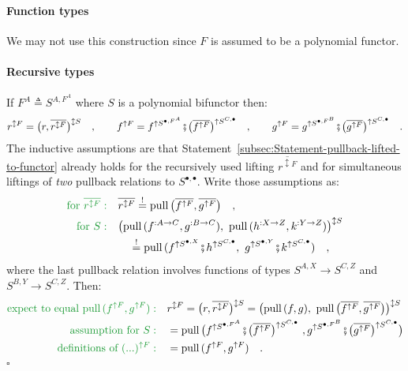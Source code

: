 \paragraph{Function types}

We may not use this construction since $F$ is assumed to be a polynomial
functor.

\paragraph{Recursive types}

If $F^{A}\triangleq S^{A,F^{A}}$ where $S$ is a polynomial bifunctor
then:
\[
r^{\updownarrow F}=\big(r,\overline{r^{\updownarrow F}}\big)^{\updownarrow S}\quad,\quad\quad f^{\uparrow F}=f^{\uparrow S^{\bullet,F^{A}}}\bef\big(\overline{f^{\uparrow F}}\big)^{\uparrow S^{C,\bullet}}\quad,\quad\quad g^{\uparrow F}=g^{\uparrow S^{\bullet,F^{B}}}\bef\big(\overline{g^{\uparrow F}}\big)^{\uparrow S^{C,\bullet}}\quad.
\]
The inductive assumptions are that Statement~\ref{subsec:Statement-pullback-lifted-to-functor}
already holds for the recursively used lifting $\overline{r^{\updownarrow F}}$
and for simultaneous liftings of \emph{two} pullback relations to
$S^{\bullet,\bullet}$. Write those assumptions as:
\begin{align*}
{\color{greenunder}\text{for }\overline{r^{\updownarrow F}}:}\quad & \overline{r^{\updownarrow F}}\overset{!}{=}\text{pull}\,\big(\overline{f^{\uparrow F}},\overline{g^{\uparrow F}}\big)\quad,\\
{\color{greenunder}\text{for }S:}\quad & \big(\text{pull}\,(f^{:A\rightarrow C},g^{:B\rightarrow C}),\,\,\text{pull}\,(h^{:X\rightarrow Z},k^{:Y\rightarrow Z})\big)^{\updownarrow S}\\
 & \quad\overset{!}{=}\text{pull}\,(f^{\uparrow S^{\bullet,X}}\bef h^{\uparrow S^{C,\bullet}},\,\,g^{\uparrow S^{\bullet,Y}}\bef k^{\uparrow S^{C,\bullet}})\quad,
\end{align*}
where the last pullback relation involves functions of types $S^{A,X}\rightarrow S^{C,Z}$
and $S^{B,Y}\rightarrow S^{C,Z}$. Then:
\begin{align*}
{\color{greenunder}\text{expect to equal }\text{pull}\,(f^{\uparrow F},g^{\uparrow F}):}\quad & r^{\updownarrow F}=\big(r,\overline{r^{\updownarrow F}}\big)^{\updownarrow S}=\big(\text{pull}\,(f,g),\,\,\text{pull}\,\big(\overline{f^{\uparrow F}},\overline{g^{\uparrow F}}\big)\big)^{\updownarrow S}\\
{\color{greenunder}\text{assumption for }S:}\quad & =\text{pull}\,\big(f^{\uparrow S^{\bullet,F^{A}}}\bef\big(\overline{f^{\uparrow F}}\big)^{\uparrow S^{C,\bullet}}\,\,,g^{\uparrow S^{\bullet,F^{B}}}\bef\big(\overline{g^{\uparrow F}}\big)^{\uparrow S^{C,\bullet}}\big)\\
{\color{greenunder}\text{definitions of }(...)^{\uparrow F}:}\quad & =\text{pull}\,(f^{\uparrow F},g^{\uparrow F})\quad.
\end{align*}
$\square$

